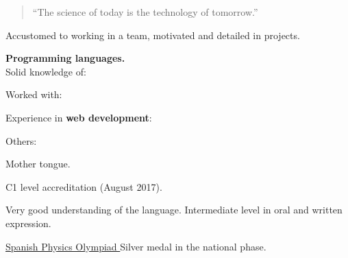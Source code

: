 

\begin{quote}
  ``The science of today is the technology of tomorrow.''
\end{quote}


Accustomed to working in a team, motivated and detailed in projects.%
\divider{}

\textbf{Programming languages.}\\[.5ex]
Solid knowledge of:\\[-2ex]
\begin{center}
\end{center}

Worked with: \quad
{}
\vspace{.75ex}
\divider{}


Experience in \textbf{web development}:
\vspace{-.05cm}
\begin{center}
\end{center}
\divider[empty]{}

Others:\quad
{}
\cvtag{\LaTeX}

\vspace{-8pt}%


\medskip
{}

\smallskip
Mother tongue.
\divider{}

\smallskip
C1 level accreditation (August 2017).
\divider{}

\smallskip
Very good understanding of the language. Intermediate level in oral and written
expression.


\medskip
{}


\cvachievement{\faTrophy}
{\href{https://rsef.es/olimpiada-espanola-de-fisica}
  {Spanish Physics Olympiad \smallskip}}
{\small{}%
  \small{}}
Silver medal in the national phase.

